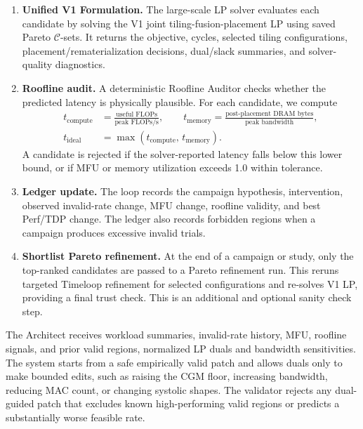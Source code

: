 \begin{enumerate}
\item \textbf{Unified V1 Formulation.} The large-scale LP solver evaluates each candidate by solving the V1 joint tiling-fusion-placement LP using saved Pareto $\mathcal{C}$-sets. It returns the objective, cycles, selected tiling configurations, placement/rematerialization decisions, dual/slack summaries, and solver-quality diagnostics.

\item \textbf{Roofline audit.} A deterministic Roofline Auditor checks whether the predicted latency is physically plausible. For each candidate,
we compute
\begin{align}
    t_{\text{compute}} &= \frac{\text{useful FLOPs}}{\text{peak FLOPs/s}},
    \qquad
    t_{\text{memory}}  = \frac{\text{post-placement DRAM bytes}}{\text{peak bandwidth}},
    \nonumber\\
    t_{\text{ideal}}   &= \max\!\left(t_{\text{compute}},\, t_{\text{memory}}\right).
\end{align}
A candidate is rejected if the solver-reported latency falls below this lower bound, or if MFU or memory utilization exceeds 1.0 within tolerance.

\item \textbf{Ledger update.} The loop records the campaign hypothesis, intervention, observed invalid-rate change, MFU change, roofline validity, and best Perf/TDP change. The ledger also records forbidden regions when a campaign produces excessive invalid trials.

\item \textbf{Shortlist Pareto refinement.} At the end of a campaign or study, only the top-ranked candidates are passed to a Pareto refinement run. This reruns targeted Timeloop refinement
for selected configurations and re-solves V1 LP, providing a final trust check. This is an additional and optional sanity check step.

\end{enumerate}

The Architect receives workload summaries, invalid-rate history, MFU, roofline signals, and prior valid regions, normalized LP duals and bandwidth sensitivities. The system starts from a safe empirically valid patch and allows duals only to make bounded edits, such as raising the CGM floor, increasing bandwidth, reducing MAC count, or changing systolic shapes. The validator rejects any dual-guided patch that excludes known high-performing valid regions or predicts a substantially worse feasible rate.


